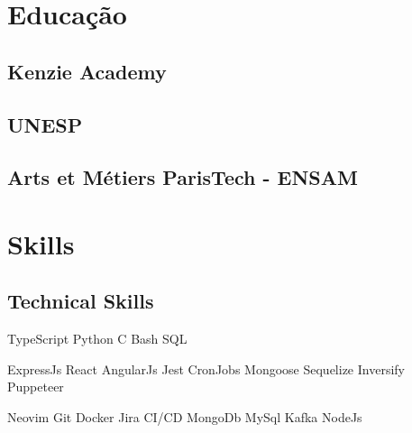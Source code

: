 \documentclass[]{deedy-resume-openfont}
\begin{document}
\begin{minipage}[t]{0.33\textwidth} 


\section{Educação} 

\subsection{Kenzie Academy}
\sectionsep

\subsection{UNESP}
\sectionsep

\subsection{Arts et Métiers ParisTech - ENSAM}
\sectionsep


\section{Skills}
\subsection{Technical Skills}

TypeScript \textbullet{} Python \textbullet{} C \textbullet{} Bash \textbullet{} SQL

\vspace{\topsep}
ExpressJs \textbullet{} React \textbullet{} AngularJs \textbullet{} Jest \textbullet{} CronJobs \textbullet{} Mongoose \textbullet{} Sequelize \textbullet{} Inversify \textbullet{} Puppeteer

\vspace{\topsep}
Neovim \textbullet{} Git \textbullet{} Docker \textbullet{}  Jira \textbullet{}
CI/CD \textbullet{} MongoDb \textbullet{} MySql \textbullet{} Kafka \textbullet{} NodeJs


\end{minipage}
\end{document}
